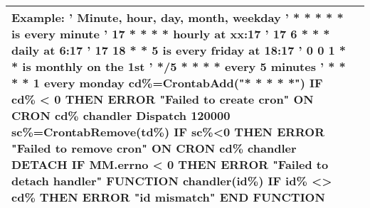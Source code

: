 \begin{table}[]
\begin{tabular}{|p{4cm}|p{10cm}|}
Example:\newline
' Minute, hour, day, month, weekday
' * * * * * is every minute
' 17 * * * * hourly at xx:17
' 17 6 * * * daily at 6:17
' 17 18 * * 5 is every friday at 18:17
' 0 0 1 * *  is monthly on the 1st
' */5 * * * * every 5 minutes
' * * * * 1 every monday
cd\%=\textbf{CrontabAdd}("* * * * *")\newline
\textbf{IF} cd\% < 0 \textbf{THEN ERROR} "Failed to create cron"\newline
\textbf{ON CRON} cd\% chandler\newline
\textbf{Dispatch} 120000\newline
sc\%=\textbf{CrontabRemove}(td\%)\newline
\textbf{IF} sc\%<0 \textbf{THEN ERROR} "Failed to remove cron" \newline
\textbf{ON CRON} cd\% chandler \textbf{DETACH}\newline
\textbf{IF} MM.errno < 0 \textbf{THEN ERROR} "Failed to detach handler"\newline
\textbf{FUNCTION} chandler(id\%)\newline
\textbf{IF} id\% <> cd\% \textbf{THEN ERROR} "id mismatch"\newline
\textbf{END FUNCTION}
\\ \hline
\end{tabular}
\end{table}
